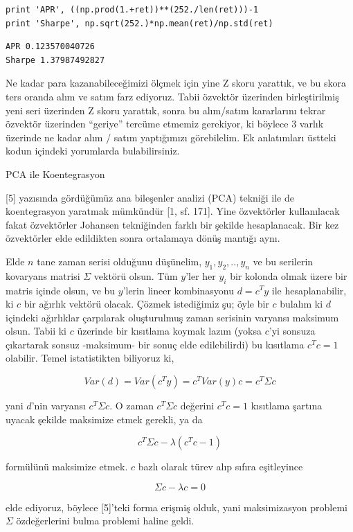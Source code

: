 \documentclass[12pt,fleqn]{article}\usepackage{../../common}
\begin{document}
\begin{verbatim}
print 'APR', ((np.prod(1.+ret))**(252./len(ret)))-1
print 'Sharpe', np.sqrt(252.)*np.mean(ret)/np.std(ret)
\end{verbatim}

\begin{verbatim}
APR 0.123570040726
Sharpe 1.37987492827
\end{verbatim}

Ne kadar para kazanabileceğimizi ölçmek için yine Z skoru yarattık, ve bu
skora ters oranda alım ve satım farz ediyoruz. Tabii özvektör üzerinden
birleştirilmiş yeni seri üzerinden Z skoru yarattık, sonra bu alım/satım
kararlarını tekrar özvektör üzerinden ``geriye'' tercüme etmemiz gerekiyor,
ki böylece 3 varlık üzerinde ne kadar alım / satım yaptığımızı
görebilelim. Ek anlatımları üstteki kodun içindeki yorumlarda
bulabilirsiniz.

PCA ile Koentegrasyon

[5] yazısında gördüğümüz ana bileşenler analizi (PCA) tekniği ile de
koentegrasyon yaratmak mümkündür [1, sf. 171]. Yine özvektörler kullanılacak
fakat özvektörler Johansen tekniğinden farklı bir şekilde hesaplanacak. Bir kez
özvektörler elde edildikten sonra ortalamaya dönüş mantığı aynı.

Elde $n$ tane zaman serisi olduğunu düşünelim, $y_1,y_2,..,y_n$ ve bu serilerin
kovaryans matrisi $\Sigma$ vektörü olsun. Tüm $y$'ler her $y_i$ bir kolonda
olmak üzere bir matris içinde olsun, ve bu $y$'lerin lineer kombinasyonu $d =
c^T y$ ile hesaplanabilir, ki $c$ bir ağırlık vektörü olacak. Çözmek istediğimiz
şu; öyle bir $c$ bulalım ki $d$ içindeki ağırlıklar çarpılarak oluşturulmuş
zaman serisinin varyansı maksimum olsun. Tabii ki $c$ üzerinde bir kısıtlama
koymak lazım (yoksa $c$'yi sonsuza çıkartarak sonsuz -maksimum- bir sonuç elde
edilebilirdi) bu kısıtlama $c^T c = 1$ olabilir. Temel istatistikten biliyoruz
ki,

$$
Var(d) = Var(c^T y) = c^T Var(y) c = c^T \Sigma c 
$$

yani $d$'nin varyansı $c^T \Sigma c$. O zaman $c^T \Sigma c$ değerini $c^Tc=1$
kısıtlama şartına uyacak şekilde maksimize etmek gerekli, ya da

$$
c^T \Sigma c - \lambda (c^Tc - 1)
$$

formülünü maksimize etmek. $c$ bazlı olarak türev alıp sıfıra eşitleyince

$$
\Sigma c - \lambda c = 0
$$

elde ediyoruz, böylece [5]'teki forma erişmiş olduk, yani maksimizasyon
problemi $\Sigma$ özdeğerlerini bulma problemi haline geldi.
\end{document}
